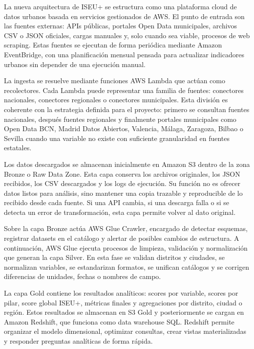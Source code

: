 La nueva arquitectura de ISEU+ se estructura como una plataforma cloud de datos urbanos basada en servicios gestionados de AWS. El punto de entrada son las fuentes externas: APIs públicas, portales Open Data municipales, archivos CSV o JSON oficiales, cargas manuales y, solo cuando sea viable, procesos de web scraping. Estas fuentes se ejecutan de forma periódica mediante Amazon EventBridge, con una planificación mensual pensada para actualizar indicadores urbanos sin depender de una ejecución manual.

La ingesta se resuelve mediante funciones AWS Lambda que actúan como recolectores. Cada Lambda puede representar una familia de fuentes: conectores nacionales, conectores regionales o conectores municipales. Esta división es coherente con la estrategia definida para el proyecto: primero se consultan fuentes nacionales, después fuentes regionales y finalmente portales municipales como Open Data BCN, Madrid Datos Abiertos, Valencia, Málaga, Zaragoza, Bilbao o Sevilla cuando una variable no existe con suficiente granularidad en fuentes estatales.

Los datos descargados se almacenan inicialmente en Amazon S3 dentro de la zona Bronze o Raw Data Zone. Esta capa conserva los archivos originales, los JSON recibidos, los CSV descargados y los logs de ejecución. Su función no es ofrecer datos listos para análisis, sino mantener una copia trazable y reproducible de lo recibido desde cada fuente. Si una API cambia, si una descarga falla o si se detecta un error de transformación, esta capa permite volver al dato original.

Sobre la capa Bronze actúa AWS Glue Crawler, encargado de detectar esquemas, registrar datasets en el catálogo y alertar de posibles cambios de estructura. A continuación, AWS Glue ejecuta procesos de limpieza, validación y normalización que generan la capa Silver. En esta fase se validan distritos y ciudades, se normalizan variables, se estandarizan formatos, se unifican catálogos y se corrigen diferencias de unidades, fechas o nombres de campo.

La capa Gold contiene los resultados analíticos: scores por variable, scores por pilar, score global ISEU+, métricas finales y agregaciones por distrito, ciudad o región. Estos resultados se almacenan en S3 Gold y posteriormente se cargan en Amazon Redshift, que funciona como data warehouse SQL. Redshift permite organizar el modelo dimensional, optimizar consultas, crear vistas materializadas y responder preguntas analíticas de forma rápida.

